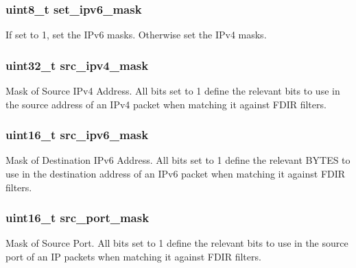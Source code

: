 \subsubsection[{set\+\_\+ipv6\+\_\+mask}]{\setlength{\rightskip}{0pt plus 5cm}uint8\+\_\+t set\+\_\+ipv6\+\_\+mask}\label{structrte__fdir__masks_a4ad06096e04ef1ca4c5b99fcf264915d}
If set to 1, set the I\+Pv6 masks. Otherwise set the I\+Pv4 masks. \hypertarget{structrte__fdir__masks_a4f7a60f12d283181289c003d2028b117}{}
\subsubsection[{src\+\_\+ipv4\+\_\+mask}]{\setlength{\rightskip}{0pt plus 5cm}uint32\+\_\+t src\+\_\+ipv4\+\_\+mask}\label{structrte__fdir__masks_a4f7a60f12d283181289c003d2028b117}
Mask of Source I\+Pv4 Address. All bits set to 1 define the relevant bits to use in the source address of an I\+Pv4 packet when matching it against F\+D\+I\+R filters. \hypertarget{structrte__fdir__masks_a2f84dc137b936998fa0e00e2ffd565f5}{}
\subsubsection[{src\+\_\+ipv6\+\_\+mask}]{\setlength{\rightskip}{0pt plus 5cm}uint16\+\_\+t src\+\_\+ipv6\+\_\+mask}\label{structrte__fdir__masks_a2f84dc137b936998fa0e00e2ffd565f5}
Mask of Destination I\+Pv6 Address. All bits set to 1 define the relevant B\+Y\+T\+E\+S to use in the destination address of an I\+Pv6 packet when matching it against F\+D\+I\+R filters. \hypertarget{structrte__fdir__masks_a3451bcc47740527fa1e2d84a14786bb3}{}
\subsubsection[{src\+\_\+port\+\_\+mask}]{\setlength{\rightskip}{0pt plus 5cm}uint16\+\_\+t src\+\_\+port\+\_\+mask}\label{structrte__fdir__masks_a3451bcc47740527fa1e2d84a14786bb3}
Mask of Source Port. All bits set to 1 define the relevant bits to use in the source port of an I\+P packets when matching it against F\+D\+I\+R filters. \hypertarget{structrte__fdir__masks_a755be91194d1d3bbabb65aa290b91990}{}
